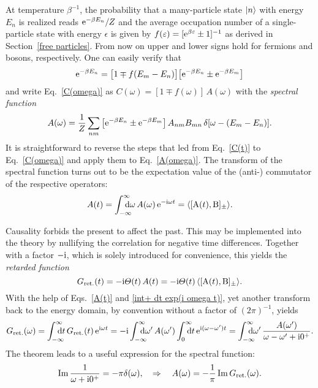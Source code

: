 At temperature $\beta^{-1}$, the probability that a many-particle state $|n\rangle$
with energy $E_n$ is realized reads $\mathrm e^{-\beta E_n} / Z$ and the average
occupation number of a single-particle state with energy $\epsilon$ is given by
$f(\varepsilon) = [\mathrm e^{\beta \varepsilon} \pm 1]^{-1}$ as derived in Section~\ref{free
particles}. From now on upper and lower signs hold for fermions and bosons,
respectively. One can easily verify that
%
\begin{equation*}
    \mathrm e^{-\beta E_n} =
    \big[ 1 \mp f(E_m - E_n) \big]
    \big[ \mathrm e^{-\beta E_n} \pm \mathrm e^{-\beta E_m} \big]
\end{equation*}
%
and write Eq.~\ref{C(omega)} as $C(\omega) = [1 \mp f(\omega)] \, A(\omega)$
with the \emph{spectral function}
%
\begin{equation} \label{A(omega)}
    A(\omega) = \frac 1 Z \sum_{n m} \big[
        \mathrm e^{-\beta E_n} \pm \mathrm e^{-\beta E_m}
    \big] \, A_{n m} B_{m n} \, \delta[\omega - (E_m - E_n)].
\end{equation}
%
It is straightforward to reverse the steps that led from Eq.~\ref{C(t)} to
Eq.~\ref{C(omega)} and apply them to Eq.~\ref{A(omega)}. The 
transform of the spectral function turns out to be the expectation value of the
(anti-) commutator of the respective operators:
%
\begin{equation} \label{A(t)}
    A(t) = \int \from{-\infty} \till \infty \D \omega \,
    A(\omega) \, \E^{-\I \omega t} =
    \av{[\op A(t), \op B]_\pm}.
\end{equation}

Causality forbids the present to affect the past. This may be implemented into
the theory by nullifying the correlation for negative time differences. Together
with a factor $-\mathrm i$, which is solely introduced for convenience, this yields the
\emph{retarded  function}
%
\begin{equation} \label{G_ret(t)}
    G \sb{\text{ret.}} (t) = -\mathrm i \varTheta(t) \, A(t) =
    -\mathrm i \varTheta(t) \, \langle[\mathrm A(t), \mathrm B]_\pm\rangle.
\end{equation}
%
With the help of Eqs.~\ref{A(t)} and \ref{int+ dt exp(i omega t)}, yet another
 transform back to the energy domain, by convention without a
factor of $(2 \pi)^{-1}$, yields
%
\begin{equation} \label{G_ret(omega)}
    G \sub{ret.} (\omega) = \int \from{-\infty} \till \infty \D t \,
    G \sub{ret.} (t) \, \E^{\I \omega t} = -\I
    \int \from{-\infty} \till \infty \D \omega' \, A(\omega')
    \int \from 0 \till \infty \D t \, \E^{\I (\omega - \omega') t} =
    \int \from{-\infty} \till \infty \D \omega' \,
    \frac{A(\omega')}{\omega - \omega' + \I 0^+}.
\end{equation}
%
The  theorem leads to a useful expression for the
spectral function:
%
\begin{equation} \label{spectral representation}
	\operatorname{Im} \frac 1 {\omega + \mathrm i 0^+} = -\pi \delta(\omega),
    \quad \Rightarrow \quad
    A(\omega) = -\frac 1 \pi \operatorname{Im} G \sb{\text{ret.}} (\omega).
\end{equation}

